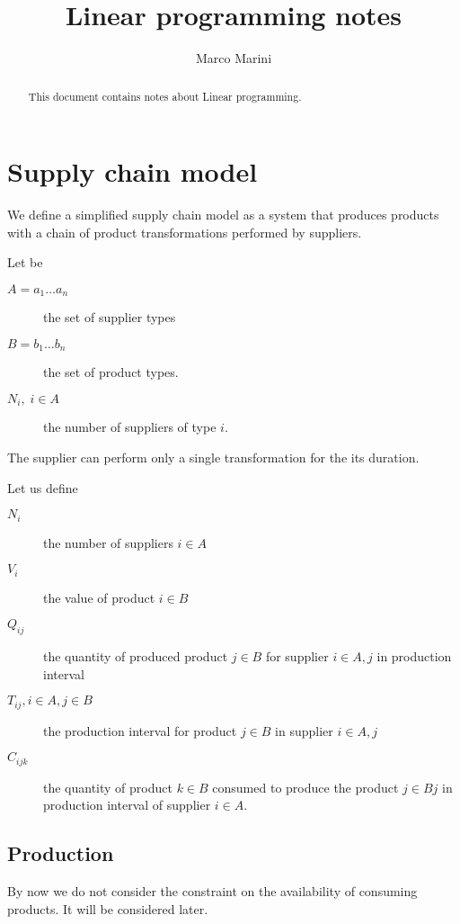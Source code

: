 \documentclass[a4paper,11pt]{article}
\title{Linear programming notes}
\author{Marco Marini}
\begin{document}
\maketitle
\tableofcontents

\begin{abstract}
This document contains notes about Linear programming.
\end{abstract}

\section{Supply chain model}

We define a simplified supply chain model as a system
that produces products with a chain of product transformations performed by suppliers.

Let be
\begin{description}
	\item [$ A = a_1 \dots a_n $]
		the set of supplier types
	\item [$ B = b_1 \dots b_n $]
		the set of product types.
	\item [$  N_i , \;i \in A $]
		the number of suppliers of type $ i $.
\end{description}

The supplier can perform only a single transformation for the its duration.

Let us define
\begin{description}
	\item[ $ N_{i} $ ]
		the number of suppliers $ i \in A $
	\item[ $ V_{i} $ ]
		the value of product $ i \in B $
	\item[ $ Q_{ij} $ ]
		the quantity of produced product $ j \in B  $ for supplier $ i \in A, j $ in production interval
	\item[ $ T_{ij}, i \in A, j \in B $ ]
		the production interval for product $ j \in B  $ in supplier $ i \in A, j $
	\item[$ C_{ijk} $ ]
		the quantity of product $ k \in B $ consumed to produce the product $ j \in Bj $ in production interval of supplier $ i \in A $.
\end{description}

\subsection{Production}

By now we do not consider the constraint on the availability of consuming products. It will be considered later.
\end{document}
